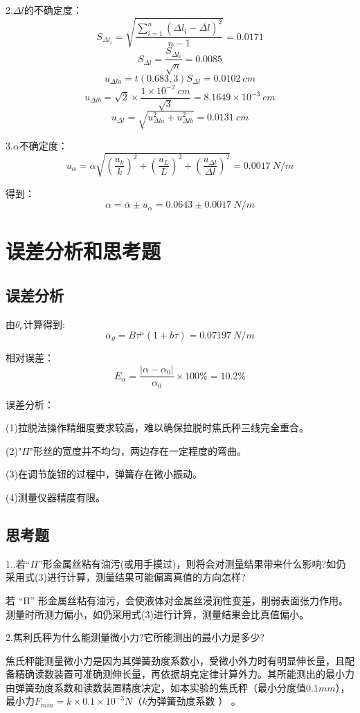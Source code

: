 \documentclass{article}
\begin{document}
2.$\Delta l$的不确定度：
$$
S_{\Delta l_i}=\sqrt{\frac{\sum_{i=1}^{n}(\Delta l_i-\overline{\Delta l})^2}{n-1}}=0.0171
$$
$$
S_{\overline{\Delta l}}=\frac{S_{\Delta l_i}}{\sqrt{n}}=0.0085
$$
$$
u_{\Delta la}=t(0.683,3)S_{\Delta l}=0.0102\ cm
$$
$$
u_{\Delta lb}=\sqrt{2}\times\frac{1\times 10^{-2}\ cm}{\sqrt{3}}=8.1649\times 10^{-3}\ cm
$$
$$
u_{\Delta l}=\sqrt{u_{\Delta la}^2+u_{\Delta lb}^2}=0.0131\ cm
$$

3.$\alpha$不确定度：
$$
u_\alpha=\overline{\alpha}\sqrt{(\frac{u_k}{k})^2+(\frac{u_L}{L})^2+(\frac{u_{\Delta l}}{\Delta l})^2}=0.0017\ N/m
$$

得到：
$$
\alpha=\overline{\alpha}\pm u_\alpha=0.0643\pm 0.0017\ N/m
$$

\section{误差分析和思考题}
\subsection{误差分析}

由$\theta_e$计算得到:
$$
\alpha_{\theta}=B\tau^{\mu}(1+b\tau)=0.07197\ N/m
$$

相对误差：
$$
E_{\alpha}=\frac{|\alpha-\alpha_0|}{\alpha_0}\times 100\%=10.2\%
$$

误差分析：

(1)拉脱法操作精细度要求较高，难以确保拉脱时焦氏秤三线完全重合。

(2)"$\Pi$"形丝的宽度并不均匀，两边存在一定程度的弯曲。

(3)在调节旋钮的过程中，弹簧存在微小振动。

(4)测量仪器精度有限。

\subsection{思考题}

1..若“$\Pi$”形金属丝粘有油污(或用手摸过)，则将会对测量结果带来什么影响?如仍采用式(3)进行计算，测量结果可能偏离真值的方向怎样?

若 “Π” 形金属丝粘有油污，会使液体对金属丝浸润性变差，削弱表面张力作用。测量时所测力偏小，如仍采用式(3)进行计算，测量结果会比真值偏小。

2.焦利氏秤为什么能测量微小力?它所能测出的最小力是多少?

焦氏秤能测量微小力是因为其弹簧劲度系数小，受微小外力时有明显伸长量，且配备精确读数装置可准确测伸长量，再依据胡克定律计算外力。其所能测出的最小力由弹簧劲度系数和读数装置精度决定，如本实验的焦氏秤（最小分度值\(0.1mm\)），最小力\(F_{min}=k\times0.1\times10^{-3}N\)（$k$为弹簧劲度系数 ） 。
\end{document}
